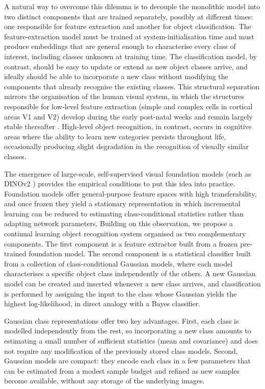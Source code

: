 A natural way to overcome this dilemma is to decouple the monolithic model into two distinct components that are trained separately, possibly at different times: one responsible for feature extraction and another for object classification. The feature-extraction model must be trained at system-initialisation time and must produce embeddings that are general enough to characterise every class of interest, including classes unknown at training time. The classification model, by contrast, should be easy to update or extend as new object classes arrive, and ideally should be able to incorporate a new class without modifying the components that already recognise the existing classes. This structural separation mirrors the organisation of the human visual system, in which the structures responsible for low-level feature extraction (simple and complex cells in cortical areas V1 and V2) develop during the early post-natal weeks and remain largely stable thereafter \cite{Sluyters90}. High-level object recognition, in contrast, occurs in cognitive areas where the ability to learn new categories persists throughout life, occasionally producing slight degradation in the recognition of visually similar classes.

The emergence of large-scale, self-supervised visual foundation models (such as DINOv2 \cite{oquab2024dinov}) provides the empirical conditions to put this idea into practice. Foundation models offer general-purpose feature spaces with high transferability, and once frozen they yield a stationary representation in which incremental learning can be reduced to estimating class-conditional statistics rather than adapting network parameters. Building on this observation, we propose a continual learning object recognition system organised as two complementary components. The first component is a feature extractor built from a frozen pre-trained foundation model. The second component is a statistical classifier built from a collection of class-conditional Gaussian models, where each model characterises a specific object class independently of the others. A new Gaussian model can be created and inserted whenever a new class arrives, and classification is performed by assigning the input to the class whose Gaussian yields the highest log-likelihood, in direct analogy with a Bayes classifier.

Gaussian class representations offer two key advantages. First, each class is modelled independently from the rest, so incorporating a new class amounts to estimating a small number of sufficient statistics (mean and covariance) and does not require any modification of the previously stored class models. Second, Gaussian models are compact: they encode each class in a few parameters that can be estimated from a modest sample budget and refined as new samples become available, without any storage of the underlying images.

